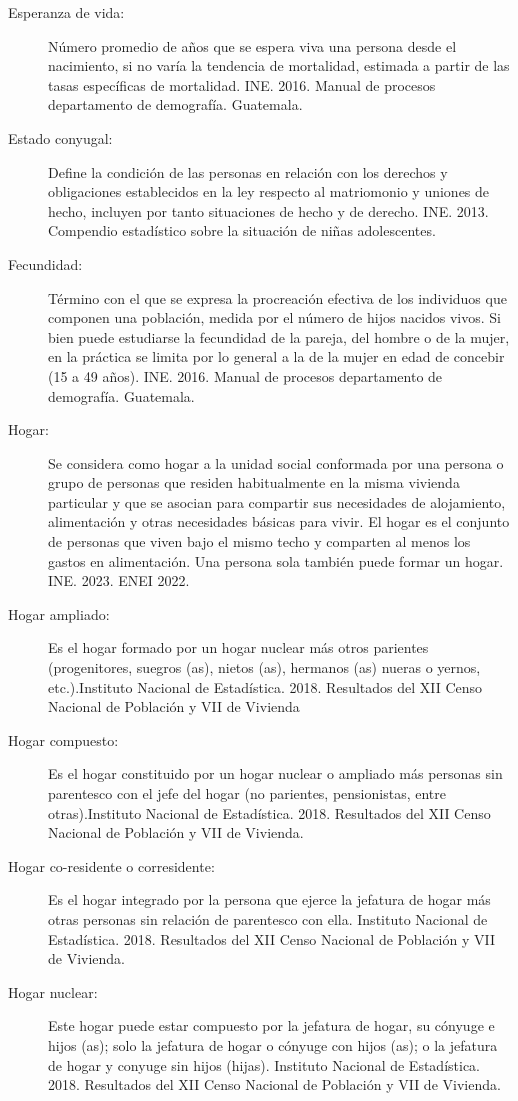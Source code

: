 \begin{description}
	\item [Esperanza de vida:] Número promedio de años que se espera viva una persona desde el nacimiento, si no varía la tendencia de mortalidad, estimada a partir de las tasas específicas de mortalidad. INE. 2016. Manual de procesos departamento de demografía. Guatemala.
	\item[Estado conyugal:] Define la condición de las personas en relación con los derechos y obligaciones establecidos en la ley respecto al matriomonio y uniones de hecho, incluyen por tanto situaciones de hecho y de derecho. INE. 2013.  Compendio estadístico sobre la situación de niñas adolescentes.
	\item[Fecundidad:] Término con el que se expresa la procreación efectiva de los individuos que componen una población, medida por el número de hijos nacidos vivos. Si bien puede estudiarse la fecundidad de la pareja, del hombre o de la mujer, en la práctica se limita por lo general a la de la mujer en edad de concebir (15 a 49 años). INE. 2016. Manual de procesos departamento de demografía. Guatemala.
	\item[Hogar:] Se considera como hogar a la unidad social conformada por una persona o grupo de personas que residen habitualmente en la misma vivienda particular y que se asocian para compartir sus necesidades de alojamiento, alimentación y otras necesidades básicas para vivir. El hogar es el conjunto de personas que viven bajo el mismo techo y comparten al menos los gastos en alimentación. Una persona sola también puede formar un hogar. INE. 2023. ENEI 2022.
	\item[Hogar ampliado:] Es el hogar formado por un hogar nuclear más otros parientes (progenitores, suegros (as), nietos (as), hermanos (as) nueras o yernos, etc.).Instituto Nacional de Estadística. 2018. Resultados del XII Censo Nacional de Población y VII de Vivienda
	\item[Hogar compuesto:] Es el hogar constituido por un hogar nuclear o ampliado más personas sin parentesco con el jefe del hogar (no parientes, pensionistas, entre otras).Instituto Nacional de Estadística. 2018. Resultados del XII Censo Nacional de Población y VII de Vivienda.
	\item[Hogar co-residente o corresidente:] Es el hogar integrado por la persona que ejerce la jefatura de hogar más otras personas sin relación de parentesco con ella. Instituto Nacional de Estadística. 2018. Resultados del XII Censo Nacional de Población y VII de Vivienda.
	\item[Hogar nuclear:] Este hogar puede estar compuesto por la jefatura de hogar, su cónyuge e hijos (as); solo la jefatura de hogar o cónyuge con hijos (as); o la jefatura de hogar y conyuge sin hijos (hijas). Instituto Nacional de Estadística. 2018. Resultados del XII Censo Nacional de Población y VII de Vivienda.

\end{description}
